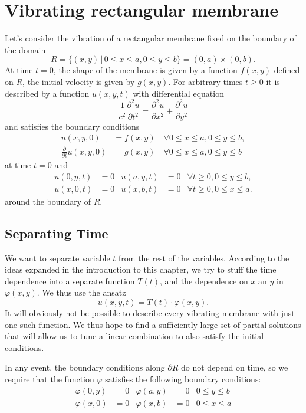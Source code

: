 %
%
%
\section{Vibrating rectangular membrane}
Let's consider the vibration of a rectangular membrane fixed on
the boundary of the domain
\[
R=\{(x,y)\,|\,0\le x\le a,0\le y\le b\} =(0,a)\times(0,b).
\]
At time $t=0$, the shape of the membrane is given by a function
$f(x,y)$ defined on $R$, the initial velocity is given by $g(x,y)$.
For arbitrary times $t\ge 0$ it is described by a function $u(x,y,t)$ 
with differential equation
\[
\frac1{c^2}\frac{\partial^2u}{\partial t^2}=\frac{\partial^2u}{\partial x^2}+\frac{\partial^2u}{\partial y^2}
\]
and satisfies the boundary conditions
\begin{align*}
u(x,y,0)&=f(x,y)\quad\forall 0\le x\le a,0\le y\le b,
\\
\frac{\partial}{\partial t}u(x,y,0)&=g(x,y)\quad\forall 0\le x\le a,0\le y\le b
\end{align*}
at time $t=0$ and
\begin{align*}
u(0,y,t)&=0&u(a,y,t)&=0&\forall t\ge 0,0\le y\le b,\\
u(x,0,t)&=0&u(x,b,t)&=0&\forall t\ge 0,0\le x\le a.
\end{align*}
around the boundary of $R$.

\subsection{Separating Time
\label{subsection:separating time}
}
We want to separate variable $t$ from the rest of the variables.
According to the ideas expanded in the introduction to this chapter,
we try to stuff the time dependence into a separate function $T(t)$,
and the dependence on $x$ an $y$ in $\varphi(x,y)$.
We thus use the ansatz
\[
u(x,y,t)=T(t)\cdot\varphi(x,y).
\]
It will obviously not be possible to describe every vibrating membrane
with just one such function.
We thus hope to find a sufficiently large set of partial solutions
that will allow us to tune a linear combination to also satisfy the 
initial conditions.

In any event, the boundary conditions along $\partial R$ do not depend
on time, so we require that the function $\varphi$ satisfies the following
boundary conditions:
\begin{align*}
\varphi(0,y)&=0&\varphi(a,y)&=0&0\le y\le b\\
\varphi(x,0)&=0&\varphi(x,b)&=0&0\le x\le a
\end{align*}

